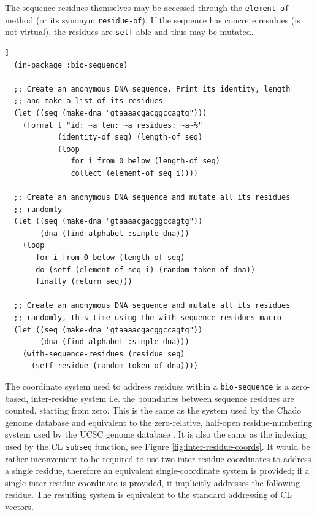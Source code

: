 \documentclass[a4paper, 12pt]{article}
\begin{document}
The sequence residues themselves may be accessed through the
\lstinline!element-of! method (or its synonym
\lstinline!residue-of!). If the sequence has concrete residues (is not
virtual), the residues are \lstinline!setf!-able and thus may be
mutated. 

\begin{lstlisting}[caption={The components of a bio-sequence},
  label=lst:components-of-bioseq,float=[tbph]]
  (in-package :bio-sequence)

  ;; Create an anonymous DNA sequence. Print its identity, length
  ;; and make a list of its residues
  (let ((seq (make-dna "gtaaaacgacggccagtg")))
    (format t "id: ~a len: ~a residues: ~a~%"
            (identity-of seq) (length-of seq)
            (loop
               for i from 0 below (length-of seq)
               collect (element-of seq i))))

  ;; Create an anonymous DNA sequence and mutate all its residues
  ;; randomly
  (let ((seq (make-dna "gtaaaacgacggccagtg"))
        (dna (find-alphabet :simple-dna)))
    (loop
       for i from 0 below (length-of seq)
       do (setf (element-of seq i) (random-token-of dna))
       finally (return seq)))
  
  ;; Create an anonymous DNA sequence and mutate all its residues
  ;; randomly, this time using the with-sequence-residues macro
  (let ((seq (make-dna "gtaaaacgacggccagtg"))
        (dna (find-alphabet :simple-dna)))
    (with-sequence-residues (residue seq)
      (setf residue (random-token-of dna))))
\end{lstlisting}

The coordinate system used to address residues within a
\lstinline!bio-sequence! is a zero-based, inter-residue system
i.e. the boundaries between sequence residues are counted, starting
from zero. This is the same as the system used by the Chado genome
database \cite{gmod-chado} and equivalent to the zero-relative,
half-open residue-numbering system used by the UCSC genome database
\cite{PMID:18996895}. It is also the same as the indexing used by the
CL \lstinline!subseq! function, see Figure
\ref{fig:inter-residue-coords}. It would be rather inconvenient
to be required to use two inter-residue coordinates to address a
single residue, therefore an equivalent single-coordinate system is
provided; if a single inter-residue coordinate is provided, it
implicitly addresses the following residue. The resulting system is
equivalent to the standard addressing of CL vectors.
\end{document}
